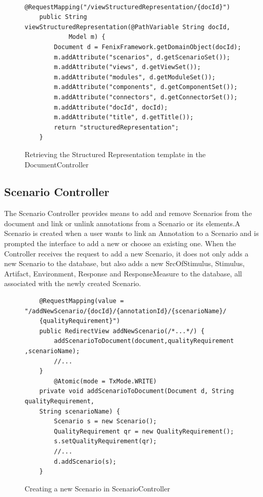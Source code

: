 \begin{itemize}
\begin{figure}[h]
\lstset{style=customjava}
\begin{lstlisting}
	@RequestMapping("/viewStructuredRepresentation/{docId}")
	public String viewStructuredRepresentation(@PathVariable String docId,
			Model m) {
		Document d = FenixFramework.getDomainObject(docId);
		m.addAttribute("scenarios", d.getScenarioSet());
		m.addAttribute("views", d.getViewSet());
		m.addAttribute("modules", d.getModuleSet());
		m.addAttribute("components", d.getComponentSet());
		m.addAttribute("connectors", d.getConnectorSet());
		m.addAttribute("docId", docId);
		m.addAttribute("title", d.getTitle());
		return "structuredRepresentation";
	}
\end{lstlisting}
\caption{Retrieving the Structured Representation template in the DocumentController}
\label{figure:documentControllerStructuredRepresentation}
\end{figure}
\end{itemize}

\subsection{Scenario Controller}

The Scenario Controller provides means to add and remove Scenarios from the document and link or unlink annotations from a Scenario or its elements.A Scenario is created when a user wants to link an Annotation to a Scenario and is prompted the interface to add a new or choose an existing one. When the Controller receives the request to add a new Scenario, it does not only adds a new Scenario to the database, but also adds a new SrcOfStimulus, Stimulus, Artifact, Environment, Response and ResponseMeasure to the database, all associated with the newly created Scenario. 

\begin{figure}[h]
\lstset{style=customjava}
\begin{lstlisting}
	@RequestMapping(value = "/addNewScenario/{docId}/{annotationId}/{scenarioName}/
	{qualityRequirement}")
	public RedirectView addNewScenario(/*...*/) {
		addScenarioToDocument(document,qualityRequirement ,scenarioName);		
		//...
	}
		@Atomic(mode = TxMode.WRITE)
	private void addScenarioToDocument(Document d, String qualityRequirement, 
	String scenarioName) {
		Scenario s = new Scenario();
		QualityRequirement qr = new QualityRequirement();
		s.setQualityRequirement(qr);
		//...		
		d.addScenario(s);
	}	
\end{lstlisting}
\caption{Creating a new Scenario in ScenarioController}
\label{figure:scenarioControllerNewScenario}
\end{figure}

